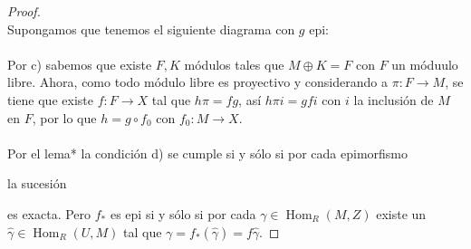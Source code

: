 \documentclass{article}
\begin{document}
\begin{enumerate}[label=\textbf{Ej \arabic*.}]
\begin{proof}
\\
Supongamos que tenemos el siguiente diagrama con $g$ epi:\\
\\
Por c) sabemos que existe $F,K$ módulos tales que $M\oplus K=F$ con $F$ un móduulo libre. Ahora,  como todo módulo libre es proyectivo y 
considerando a $\pi\colon F\longrightarrow M$, se tiene que existe $f\colon F\longrightarrow X$ tal que $h\pi=fg$, así
$h\pi i=gfi$ con $i$ la inclusión de $M$ en $F$, por lo que $h=g\circ f_0$ con $f_0\colon M\longrightarrow X$.\\
\\
Por el lema* la condición d) se cumple si y sólo si por cada epimorfismo 
la sucesión 
es exacta. Pero $f_*$ es epi si y sólo si por cada $\gamma\in \operatorname{Hom}_R(M,Z)$ existe un $\hat{\gamma}\in \operatorname{Hom}_R(U,M)$
tal que $\gamma=f_*(\hat{\gamma})=f\hat{\gamma}.$


\end{proof}
\end{enumerate}
\end{document}
